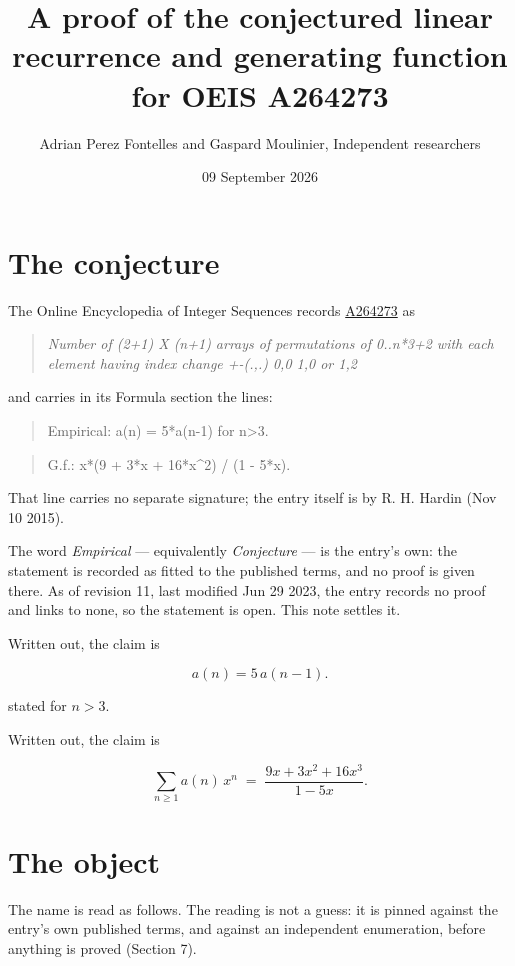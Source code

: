 \documentclass[11pt]{article}
\title{A proof of the conjectured linear recurrence and generating function for OEIS A264273}
\author{Adrian Perez Fontelles and Gaspard Moulinier, Independent researchers}
\date{09 September 2026}
\theoremstyle{definition}
\begin{document}
\maketitle
\section{The conjecture}

The Online Encyclopedia of Integer Sequences records \href{https://oeis.org/A264273}{A264273} as

\begin{quote}\itshape Number of (2+1) X (n+1) arrays of permutations of 0..n*3+2 with each element having index change +-(.,.) 0,0 1,0 or 1,2\end{quote}

and carries in its Formula section the lines:

\begin{quote}\ttfamily Empirical: a(n) = 5*a(n-1) for n>3.\end{quote}

\begin{quote}\ttfamily G.f.: x*(9 + 3*x + 16*x\textasciicircum{}2) / (1 - 5*x).\end{quote}

That line carries no separate signature; the entry itself is by R. H. Hardin (Nov 10 2015).

The word {\itshape Empirical} --- equivalently {\itshape Conjecture} --- is the entry's own: the statement is recorded as fitted to the published terms, and no proof is given there. As of revision 11, last modified Jun 29 2023, the entry records no proof and links to none, so the statement is open. This note settles it.

Written out, the claim is

\[a(n) = 5\,a(n-1).\]

stated for $n > 3$.

Written out, the claim is

\[\sum_{n \ge 1} a(n)\,x^n \;=\; \frac{9x + 3x^{2} + 16x^{3}}{1 - 5x}.\]

\section{The object}

The name is read as follows. The reading is not a guess: it is pinned against the entry's own published terms, and against an independent enumeration, before anything is proved (Section 7).
\end{document}
